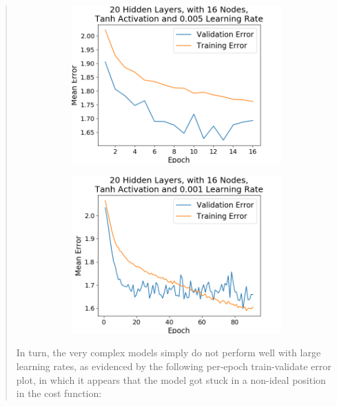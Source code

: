 \documentclass{article}
\begin{document}
\begin{quote}
\begin{figure}[h!]
\begin{subfigure}[h]{0.23\textwidth}
		\includegraphics[width=\textwidth]{figs/Emotions_Multiclass_Classification_20_Hidden_Layers_with_16_Nodes_Tanh_Activation_and_0.005_Learning_Rate.png}
	\end{subfigure}
	\begin{subfigure}[h]{0.23\textwidth}
		\includegraphics[width=\textwidth]{figs/Emotions_Multiclass_Classification_20_Hidden_Layers_with_16_Nodes_Tanh_Activation_and_0.001_Learning_Rate.png}
	\end{subfigure}
\end{figure}

 In turn, the very complex models simply do not perform well with large learning rates, as evidenced by the following per-epoch train-validate error plot, in which it appears that the model got stuck in a non-ideal position in the cost function:


\end{quote}
\end{document}
